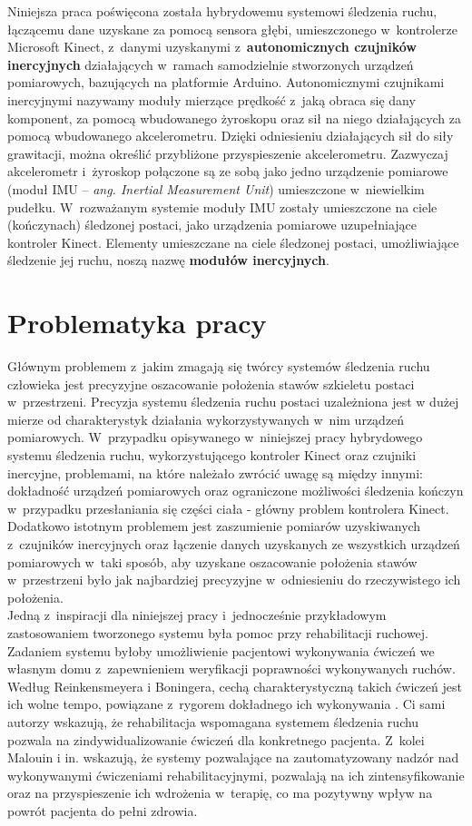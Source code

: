 Niniejsza praca poświęcona została hybrydowemu systemowi śledzenia ruchu, łączącemu dane uzyskane za pomocą sensora głębi, umieszczonego w~kontrolerze Microsoft Kinect, z~danymi uzyskanymi z~\textbf{autonomicznych czujników inercyjnych} działających w~ramach samodzielnie stworzonych urządzeń pomiarowych, bazujących na platformie Arduino. Autonomicznymi czujnikami inercyjnymi nazywamy moduły mierzące prędkość z~jaką obraca się dany komponent, za pomocą wbudowanego żyroskopu oraz sił na niego działających za pomocą wbudowanego akcelerometru. Dzięki odniesieniu działających sił do siły grawitacji, można określić przybliżone przyspieszenie akcelerometru.
Zazwyczaj akcelerometr i~żyroskop połączone są ze sobą jako jedno urządzenie pomiarowe (moduł IMU -- \emph{ang. Inertial Measurement Unit}) umieszczone w~niewielkim pudełku. W~rozważanym systemie moduły IMU zostały umieszczone na ciele (kończynach) śledzonej postaci, jako urządzenia pomiarowe uzupełniające kontroler Kinect. Elementy umieszczane na ciele śledzonej postaci, umożliwiające śledzenie jej ruchu, noszą nazwę \textbf{modułów inercyjnych}. \\

\section{Problematyka pracy}
Głównym problemem z~jakim zmagają się twórcy systemów śledzenia ruchu człowieka jest precyzyjne oszacowanie położenia stawów szkieletu postaci w~przestrzeni. Precyzja systemu śledzenia ruchu postaci uzależniona jest w dużej mierze od charakterystyk działania wykorzystywanych w~nim urządzeń pomiarowych. W~przypadku opisywanego w~niniejszej pracy hybrydowego systemu śledzenia ruchu, wykorzystującego kontroler Kinect oraz czujniki inercyjne, problemami, na które należało zwrócić uwagę są między innymi: dokładność urządzeń pomiarowych oraz ograniczone możliwości śledzenia kończyn w~przypadku przesłaniania się części ciała - główny problem kontrolera Kinect. Dodatkowo istotnym problemem jest zaszumienie pomiarów uzyskiwanych z~czujników inercyjnych oraz łączenie danych uzyskanych ze wszystkich urządzeń pomiarowych w~taki sposób, aby uzyskane oszacowanie położenia stawów w~przestrzeni było jak najbardziej precyzyjne w~odniesieniu do rzeczywistego ich położenia.\\

Jedną z~inspiracji dla niniejszej pracy i~jednocześnie przykładowym zastosowaniem tworzonego systemu była pomoc przy rehabilitacji ruchowej. Zadaniem systemu byłoby umożliwienie pacjentowi wykonywania ćwiczeń we własnym domu z~zapewnieniem weryfikacji poprawności wykonywanych ruchów. Według Reinkensmeyera i Boningera, cechą charakterystyczną takich ćwiczeń jest ich wolne tempo, powiązane z~rygorem dokładnego ich wykonywania  \cite{Reinkensmeyer2012}. Ci sami autorzy wskazują, że rehabilitacja wspomagana systemem śledzenia ruchu pozwala na zindywidualizowanie ćwiczeń dla konkretnego pacjenta. Z~kolei Malouin i in. \cite{Malouin2003} wskazują, że systemy pozwalające na zautomatyzowany nadzór nad wykonywanymi ćwiczeniami rehabilitacyjnymi, pozwalają na ich zintensyfikowanie oraz na przyspieszenie ich wdrożenia w~terapię, co ma pozytywny wpływ na powrót pacjenta do pełni zdrowia.

